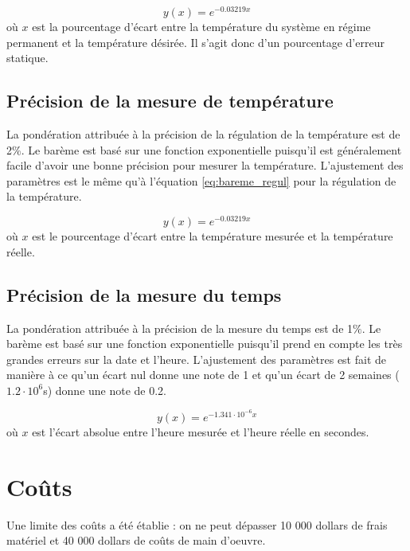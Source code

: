 \begin{equation}
    y(x) = e^{-0.03219x}
    \label{eq:bareme_regul}
\end{equation}
où $x$ est la pourcentage d'écart entre la température du système en régime permanent et la température désirée. Il s'agit donc d'un pourcentage d'erreur statique.

\subsection{Précision de la mesure de température}
\label{Pdlmdt}

La pondération attribuée à la précision de la régulation de la température est de 2$\%$. Le barème est basé sur une fonction exponentielle puisqu'il est généralement facile d'avoir une bonne précision pour mesurer la température. L'ajustement des paramètres est le même qu'à l'équation \ref{eq:bareme_regul} pour la régulation de la température.

\begin{equation}
    y(x) = e^{-0.03219x}
    \label{eq:bareme_precision_temperature}
\end{equation}
où $x$ est le pourcentage d'écart entre la température mesurée et la température réelle.

\subsection{Précision de la mesure du temps}
\label{Pdlmdtasd}

La pondération attribuée à la précision de la mesure du temps est de 1$\%$. Le barème est basé sur une fonction exponentielle puisqu'il prend en compte les très grandes erreurs sur la date et l'heure. L'ajustement des paramètres est fait de manière à ce qu'un écart nul donne une note de 1 et qu'un écart de 2 semaines ($1.2\cdot 10^6$s) donne une note de 0.2.

\begin{equation}
    y(x) = e^{-1.341\cdot10^{-6}x}
    \label{eq:bareme_precision_temps}
\end{equation}
où $x$ est l'écart absolue entre l'heure mesurée et l'heure réelle en secondes.

\section{Coûts}
\label{Coutsgloba}

Une limite des coûts a été établie : on ne peut dépasser 10 000 dollars de frais matériel et 40 000 dollars de coûts de main d'oeuvre. 


